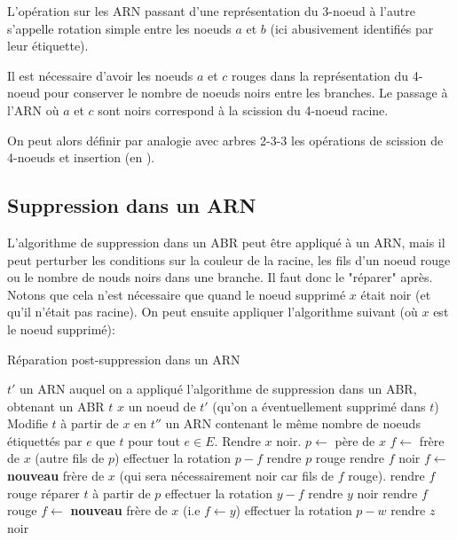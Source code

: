 \documentclass{scrartcl}
\begin{document}
			\rem L'opération sur les ARN passant d'une représentation du 3-noeud à l'autre s'appelle rotation simple entre les noeuds $a$ et $b$ (ici abusivement identifiés par leur étiquette).

			\rem Il est nécessaire d'avoir les noeuds $a$ et $c$ rouges dans la représentation du 4-noeud pour conserver le nombre de noeuds noirs entre les branches.
				Le passage à l'ARN où $a$ et $c$ sont noirs correspond à la scission du 4-noeud racine.

			On peut alors définir par analogie avec arbres 2-3-3 les opérations de scission de 4-noeuds et insertion (en \exercice).

		\subsection{Suppression dans un ARN}
			L'algorithme de suppression dans un ABR peut être appliqué à un ARN, mais il peut perturber les conditions sur la couleur de la racine, les fils d'un noeud rouge ou le nombre de nouds noirs dans une branche. Il faut donc le "réparer" après. Notons que cela n'est nécessaire que quand le noeud supprimé $x$ était noir (et qu'il n'était pas racine).
			On peut ensuite appliquer l'algorithme suivant (où $x$ est le noeud supprimé):

			\begin{algorithm}[H]
				\caption{Réparation post-suppression dans un ARN}
				\Entree
				{
					$t'$ un ARN auquel on a appliqué l'algorithme de suppression dans un ABR, obtenant un ABR $t$
					$x$ un noeud de $t'$ (qu'on a éventuellement supprimé dans $t$)
				}
				\Sortie
				{
					Modifie $t$ à partir de $x$ en $t''$ un ARN contenant le même nombre de noeuds étiquettés par $e$ que $t$ pour tout $e \in E$.
				}
				{
					Rendre $x$ noir.
				}
				{
					{
						$p \leftarrow$ père de $x$ \;
						$f \leftarrow$ frère de $x$ (autre fils de $p$) \;
						{
							effectuer la rotation $p-f$ \;
							rendre $p$ rouge \;
							rendre $f$ noir
							$f \leftarrow$ \textbf{nouveau} frère de $x$ (qui sera nécessairement noir car fils de $f$ rouge).
						}
						{
							rendre $f$ rouge \;
							réparer $t$ à partir de $p$
						}
						{
							{
								effectuer la rotation $y-f$ \;
								rendre $y$ noir \;
								rendre $f$ rouge \;
								$f \leftarrow$ \textbf{nouveau} frère de $x$ (i.e $f \leftarrow y$)
							}
							{
								effectuer la rotation $p-w$ \;
								rendre $z$ noir
							}
						}
					}
				}
			\end{algorithm}
\end{document}
